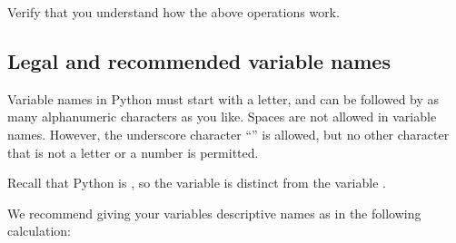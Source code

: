 \documentclass[letterpaper,10pt,english]{sphinxmanual}
\begin{document}
\begin{sphinxVerbatim}[commandchars=\\\{\},numbers=left,firstnumber=1,stepnumber=1]
     

  


  


  


  

\end{sphinxVerbatim}

\sphinxAtStartPar
Verify that you understand how the above operations work.

\ignorespaces 

\subsection{Legal and recommended variable names}
\label{\detokenize{chap2/chap2_basics:legal-and-recommended-variable-names}}\label{\detokenize{chap2/chap2_basics:index-14}}
\sphinxAtStartPar
Variable names in Python must start with a letter, and can be followed by as many alphanumeric characters as you like. Spaces are not allowed in variable names.  However, the underscore character “\sphinxcode{\sphinxupquote{\_}}” is allowed, but no other character that is not a letter or a number is permitted.

\sphinxAtStartPar
Recall that Python is , so the variable  is distinct from the variable .

\sphinxAtStartPar
We recommend giving your variables descriptive names as in the following calculation:
\end{document}

